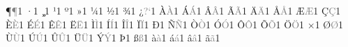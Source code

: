 {        {^^b6}{{\textcolor{gray}{\P}}}1  %
        {^^b7}{{\textcolor{gray}{\textperiodcentered}}}1  %
        {^^b8}{{\textcolor{gray}{\c{}}}}1  %
        {^^b9}{{\textcolor{gray}{\textonesuperior}}}1  %
        {^^ba}{{\textcolor{gray}{\textordmasculine}}}1  %
        {^^bb}{{\textcolor{gray}{\guillemotright}}}1  %
        {^^bc}{{\textcolor{gray}{\textonequarter}}}1  %
        {^^bd}{{\textcolor{gray}{\textonehalf}}}1  %
        {^^be}{{\textcolor{gray}{\textthreequarters}}}1  %
        {^^bf}{{\textcolor{gray}{?`}}}1  %
        {^^c0}{{\textcolor{gray}{\`{A}}}}1  %
        {^^c1}{{\textcolor{gray}{\'{A}}}}1  %
        {^^c2}{{\textcolor{gray}{\^{A}}}}1  %
        {^^c3}{{\textcolor{gray}{\~{A}}}}1  %
        {^^c4}{{\textcolor{gray}{\"{A}}}}1  %
        {^^c5}{{\textcolor{gray}{\AA}}}1  %
        {^^c6}{{\textcolor{gray}{\AE}}}1  %
        {^^c7}{{\textcolor{gray}{\c{C}}}}1  %
        {^^c8}{{\textcolor{gray}{\`{E}}}}1  %
        {^^c9}{{\textcolor{gray}{\'{E}}}}1  %
        {^^ca}{{\textcolor{gray}{\^{E}}}}1  %
        {^^cb}{{\textcolor{gray}{\"{E}}}}1  %
        {^^cc}{{\textcolor{gray}{\`{I}}}}1  %
        {^^cd}{{\textcolor{gray}{\'{I}}}}1  %
        {^^ce}{{\textcolor{gray}{\^{I}}}}1  %
        {^^cf}{{\textcolor{gray}{\"{I}}}}1  %
        {^^d0}{{\textcolor{gray}{\DH}}}1  %
        {^^d1}{{\textcolor{gray}{\~{N}}}}1  %
        {^^d2}{{\textcolor{gray}{\`{O}}}}1  %
        {^^d3}{{\textcolor{gray}{\'{O}}}}1  %
        {^^d4}{{\textcolor{gray}{\^{O}}}}1  %
        {^^d5}{{\textcolor{gray}{\~{O}}}}1  %
        {^^d6}{{\textcolor{gray}{\"{O}}}}1  %
        {^^d7}{{\textcolor{gray}{\texttimes}}}1  %
        {^^d8}{{\textcolor{gray}{\O}}}1  %
        {^^d9}{{\textcolor{gray}{\`{U}}}}1  %
        {^^da}{{\textcolor{gray}{\'{U}}}}1  %
        {^^db}{{\textcolor{gray}{\^{U}}}}1  %
        {^^dc}{{\textcolor{gray}{\"{U}}}}1  %
        {^^dd}{{\textcolor{gray}{\'{Y}}}}1  %
        {^^de}{{\textcolor{gray}{\TH}}}1  %
        {^^df}{{\textcolor{gray}{\ss}}}1  %
        {^^e0}{{\textcolor{gray}{\`{a}}}}1  %
        {^^e1}{{\textcolor{gray}{\'{a}}}}1  %
        {^^e2}{{\textcolor{gray}{\^{a}}}}1  %
        {^^e3}{{\textcolor{gray}{\~{a}}}}1  %
}
